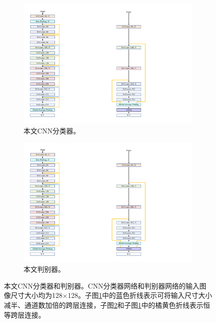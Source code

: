 \begin{figure}[h!]
	\centering
	\begin{subfigure}{0.3\textwidth}
		\centering
		\includegraphics[width=1.0\textwidth]{figure/classifier_architecture.pdf}
		\caption{本文CNN分类器。}
		\label{subfig:classifier_architecture}
	\end{subfigure}
	\qquad\qquad\qquad\qquad
	\begin{subfigure}{0.348\textwidth}
		\centering
		\includegraphics[width=1.0\textwidth]{figure/discrimintor_architecture.pdf}
		\caption{本文判别器。}
		\label{subfig:discrimintor_architecture}
	\end{subfigure}
	\caption[本文CNN分类器和判别器]{本文CNN分类器和判别器。CNN分类器网络和判别器网络的输入图像尺寸大小均为128$\times$128。子图\ref{subfig:classifier_architecture}中的蓝色折线表示可将输入尺寸大小减半、通道数加倍的跨层连接，子图\ref{subfig:discrimintor_architecture}和子图\ref{subfig:classifier_architecture}中的橘黄色折线表示恒等跨层连接。}
	\label{mul_fig:classifier_and_discrimintor_architecture}
\end{figure}

